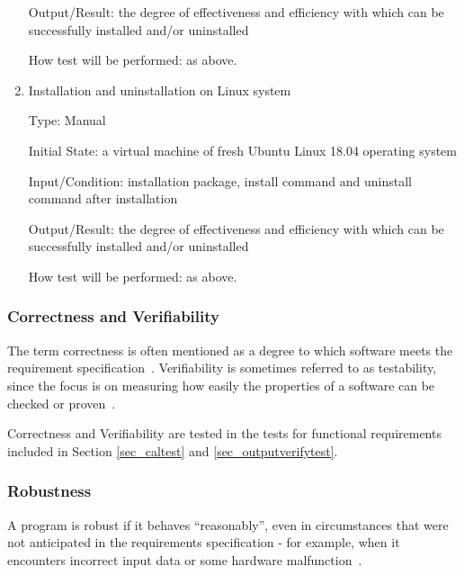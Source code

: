 \documentclass[12pt, titlepage]{article}
\begin{document}
\begin{enumerate}
Output/Result: the degree of effectiveness and efficiency with which \progname{}
can be successfully installed and/or uninstalled
					
How test will be performed: as above.

\item{Installation and uninstallation on Linux system}

Type: Manual
					
Initial State: a virtual machine of fresh Ubuntu Linux 18.04 operating system
					
Input/Condition: \progname{} installation package, install command and uninstall
command after installation
					
Output/Result: the degree of effectiveness and efficiency with which \progname{}
can be successfully installed and/or uninstalled
					
How test will be performed: as above.
\end{enumerate}


\subsubsection{Correctness and Verifiability} \label{sec_correctverfiabletest}

The term correctness is often mentioned as a degree to which software meets the
requirement specification~\cite{IEEE1990}.  Verifiability is sometimes referred
to as testability, since the focus is on measuring how easily the properties of
a software can be checked or proven~\cite{SmithEtAl2018}.
		
Correctness and Verifiability are tested in the tests for functional
requirements included in Section \ref{sec_caltest} and
\ref{sec_outputverifytest}. 

\subsubsection{Robustness} \label{sec_robustnesstest}

A program is robust if it behaves ``reasonably'', even
in circumstances that were not anticipated in the requirements specification -
for example, when it encounters incorrect input data or some hardware
malfunction~\cite{Ghezzi1991}.
\end{document}

